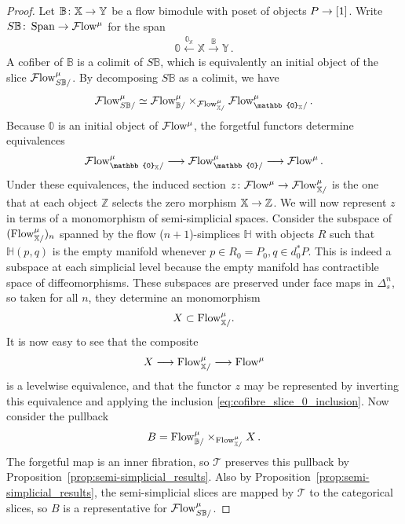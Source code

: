 \documentclass[10pt]{amsart}
\numberwithin{equation}{section}
\theoremstyle{definition}
\DeclareMathOperator{\Span}{Span}
\newcommand{\Flow}{\cF\mathrm{low}\vphantom{w}}
\newcommand{\PreFlow}{\mathrm{Flow}\vphantom{w}}
\newcommand{\bB}{\mathbb{B}}
\newcommand{\bH}{\mathbb{H}}
\newcommand{\bZ}{\mathbb{Z}}
\newcommand{\bX}{\mathbb{X}}
\newcommand{\bY}{\mathbb{Y}}
\newcommand{\bZero}{\mathbb{0}}
\newcommand{\cF}{\mathcal{F}}
\newcommand{\cT}{\mathcal{T}}
\renewcommand{\to}{\mathchoice{\longrightarrow}{\rightarrow}{}{}}
\begin{document}
\begin{proof}
	Let $\bB\colon \bX\to \bY$ be a flow bimodule with poset of objects $P \to [1]$. Write $S\bB\colon \Span \to \Flow^{\mu}$ for the span
	\begin{align*}
		\bZero \xleftarrow{\bZero_{\bX}} \bX \xrightarrow{\bB} \bY \,.
	\end{align*}
	A cofiber of $\bB$ is a colimit of $S\bB$, which is equivalently an initial object of the slice $\Flow^{\mu}_{S\bB/}$.
	By decomposing $S\bB$ as a colimit, we have
	\begin{align}\label{eq:cofibers_Flow_pullback}
		\Flow^{\mu}_{S\bB/}\simeq \Flow^{\mu}_{\bB /}\times_{\Flow^{\mu}_{\bX /} } \Flow^{\mu}_{\bZero_{\bX}/} \,.
	\end{align}
	Because $\bZero$ is an initial object of $\Flow^{\mu}$, the forgetful functors determine equivalences
	\begin{align*}
		\Flow^{\mu}_{\bZero_{\bX}/} \to \Flow^{\mu}_{\bZero/} \to \Flow^{\mu} \,.
	\end{align*}
	Under these equivalences, the induced section $z\colon \Flow^{\mu} \to \Flow^{\mu}_{\bX/}$ is the one that at each object $\bZ$ selects the zero morphism $\bX\to \bZ$.
	We will now represent $z$ in terms of a monomorphism of semi-simplicial spaces.
	Consider the subspace of $(\PreFlow^{\mu}_{\bX/})_{n}$ spanned by the flow ($n+1$)-simplices $\bH$ with objects $R$ such that $\bH(p,q)$ is the empty manifold whenever $p\in R_{0}=P_{0}, q\in d_{0}^{*}P$.
	This is indeed a subspace at each simplicial level because the empty manifold has contractible space of diffeomorphisms.
	These subspaces are preserved under face maps in $\Delta^{n}_{s}$, so taken for all $n$, they determine an monomorphism
	\begin{align}\label{eq:cofibre_slice_0_inclusion}
		X \subset \PreFlow^{\mu}_{\bX/}.
	\end{align}
	It is now easy to see that the composite
	\begin{align*}
		X \to \PreFlow^{\mu}_{\bX/} \to \PreFlow^{\mu}
	\end{align*}
	is a levelwise equivalence, and that the functor $z$ may be represented by inverting this equivalence and applying the inclusion \eqref{eq:cofibre_slice_0_inclusion}.
	Now consider the pullback
	\begin{align*}
		B = \PreFlow^{\mu}_{\bB/} \times_{\PreFlow^{\mu}_{\bX /}} X \,.
	\end{align*}
	The forgetful map is an inner fibration, so $\cT$ preserves this pullback by Proposition~\ref{prop:semi-simplicial_results}.
	Also by Proposition~\ref{prop:semi-simplicial_results}, the semi-simplicial slices are mapped by $\cT$ to the categorical slices, so $B $ is a representative for $\Flow^{\mu}_{S\bB /}$.


\end{proof}
\end{document}
